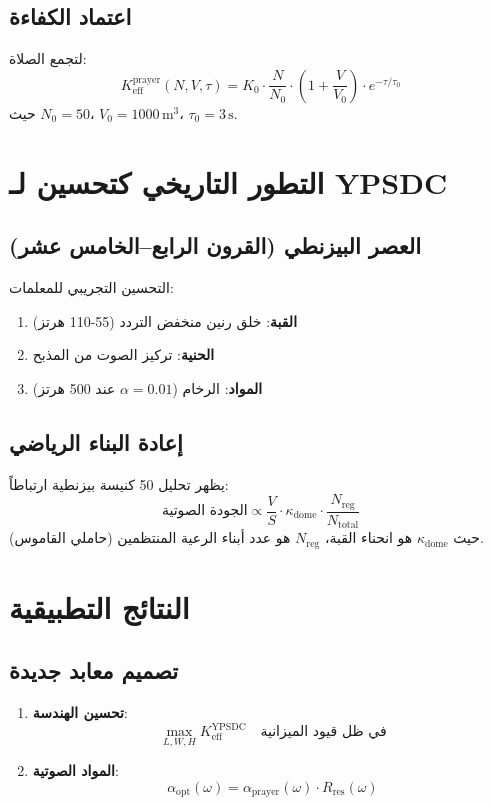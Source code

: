 \documentclass[12pt,a4paper]{article}
\begin{document}
	\subsection{اعتماد الكفاءة}
	
	لتجمع الصلاة:
	\[
	K_{\mathrm{eff}}^{\mathrm{prayer}}(N, V, \tau) = K_0 \cdot \frac{N}{N_0} \cdot \left(1 + \frac{V}{V_0}\right) \cdot e^{-\tau/\tau_0}
	\]
	حيث $N_0 = 50$، $V_0 = 1000 \, \mathrm{m}^3$، $\tau_0 = 3 \, \mathrm{s}$.
	
	\section{التطور التاريخي كتحسين لـ YPSDC}
	
	\subsection{العصر البيزنطي (القرون الرابع–الخامس عشر)}
	
	التحسين التجريبي للمعلمات:
	\begin{enumerate}
		\item \textbf{القبة}: خلق رنين منخفض التردد (55-110 هرتز)
		\item \textbf{الحنية}: تركيز الصوت من المذبح
		\item \textbf{المواد}: الرخام ($\alpha = 0.01$ عند 500 هرتز)
	\end{enumerate}
	
	\subsection{إعادة البناء الرياضي}
	
	يظهر تحليل 50 كنيسة بيزنطية ارتباطاً:
	\[
	\text{الجودة الصوتية} \propto \frac{V}{S} \cdot \kappa_{\mathrm{dome}} \cdot \frac{N_{\mathrm{reg}}}{N_{\mathrm{total}}}
	\]
	حيث $\kappa_{\mathrm{dome}}$ هو انحناء القبة، $N_{\mathrm{reg}}$ هو عدد أبناء الرعية المنتظمين (حاملي القاموس).
	
	\section{النتائج التطبيقية}
	
	\subsection{تصميم معابد جديدة}
	
	\begin{enumerate}
		\item \textbf{تحسين الهندسة}:
		\[
		\max_{L, W, H} K_{\mathrm{eff}}^{\mathrm{YPSDC}} \quad \text{في ظل قيود الميزانية}
		\]
		\item \textbf{المواد الصوتية}:
		\[
		\alpha_{\mathrm{opt}}(\omega) = \alpha_{\mathrm{prayer}}(\omega) \cdot R_{\mathrm{res}}(\omega)
		\]
	\end{enumerate}
	
\end{document}
